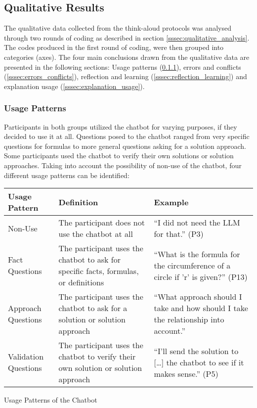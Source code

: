 \endgroup

\subsection{Qualitative Results} \label{ssec:qual_results}

The qualitative data collected from the think-aloud protocols was analysed through two rounds of coding as described in section \ref{sssec:qualitative_analysis}. The codes produced in the first round of coding, were then grouped into categories (axes). The four main conclusions drawn from the qualitative data are presented in the following sections: Usage patterns (\ref{sssec:usage_patterns}), errors and conflicts (\ref{sssec:errors_conflicts}), reflection and learning (\ref{sssec:reflection_learning}) and explanation usage (\ref{sssec:explanation_usage}).

\subsubsection{Usage Patterns} \label{sssec:usage_patterns}

Participants in both groups utilized the chatbot for varying purposes, if they decided to use it at all. Questions posed to the chatbot ranged from very specific questions for formulas to more general questions asking for a solution approach. Some participants used the chatbot to verify their own solutions or solution approaches. Taking into account the possibility of non-use of the chatbot, four different usage patterns can be identified:

\begin{ctable}
    \begin{tabularx}{\textwidth}{l|X|X}
        \textbf{Usage Pattern} & \textbf{Definition} & \textbf{Example} \\
        \hline
        Non-Use & The participant does not use the chatbot at all & “I did not need the LLM for that.” (P3) \\
        Fact Questions & The participant uses the chatbot to ask for specific facts, formulas, or definitions & “What is the formula for the circumference of a circle if 'r' is given?” (P13) \\
        Approach Questions & The participant uses the chatbot to ask for a solution or solution approach & “What approach should I take and how should I take the relationship into account.” \\
        Validation Questions & The participant uses the chatbot to verify their own solution or solution approach & “I'll send the solution to [\dots] the chatbot to see if it makes sense.” (P5)
    \end{tabularx}
    \caption{Usage Patterns of the Chatbot}
    \label{tab:usage_patterns}
\end{ctable}


